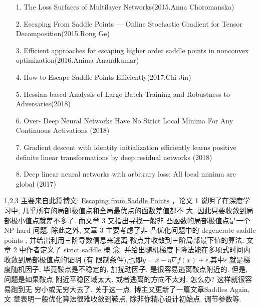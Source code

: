 \documentclass[UTF8]{ctexart}
\begin{document}
\begin{itemize}
	\item[1.] The Loss Surfaces of Multilayer Networks(2015.Anna Choromanska) \label{all not diff}
	\item[2.]  Escaping From Saddle Points — Online Stochastic Gradient for Tensor
	Decomposition(2015.Rong Ge)
	\item[3.] Efficient approaches for escaping higher order saddle points in 
	nonconvex optimization(2016.Anima Anandkumar)
	\item[4.]  How to Escape Saddle Points Efficiently(2017.Chi Jin)
	\item[5.]  Hessian-based Analysis of Large Batch Training and Robustness to
	Adversaries(2018)
	\item[6.] Over- Deep Neural Networks Have No Strict Local Minima For Any
	Continuous Activations (2018)
	\item[7.] Gradient descent with identity initialization efficiently learns positive
	definite linear transformations by deep residual networks (2018)
	\item[8.] Deep linear neural networks with arbitrary loss: All local minima are
	global (2017)
	
\end{itemize}

1,2,3 主要来自此篇博文:
\href{http://www.offconvex.org/2016/03/22/saddlepoints/}{Escaping from Saddle Points}
，论文 1 说明了在深度学习中, 几乎所有的局部极值点和全局最优点的函数差值都不
大, 因此只要收敛到局部极小值点就差不多了. 而文章 3 又指出寻找一般非
凸函数的局部极值点是一个 NP-hard 问题. 除此之外, 文章 3 主要考虑了非
凸优化问题中的 degenerate saddle points , 并给出利用三阶导数信息来逃离
鞍点并收敛到三阶局部最下值的算法. 文章 2 中作者定义了 strict saddle 概
念, 并给出随机梯度下降法能在多项式时间内收敛到局部极值点的证明 (有
限制条件),也即$y=x-\eta \nabla f(x)+\epsilon$,其中$\epsilon$ 就是梯度随机因子.
毕竟鞍点是不稳定的, 加扰动因子, 是很容易逃离鞍点附近的. 但是, 问题是如果鞍点
附近平稳区域太大, 或者逃离的方向不太对, 怎么办? 这样就很容易跑到无
穷小或无穷大去了. 关于这一点, 博主又更新了一篇文章Saddles Again, 文
章表明一般优化算法很难收敛到鞍点, 除非你精心设计初始点, 调节参数等.
\end{document}
